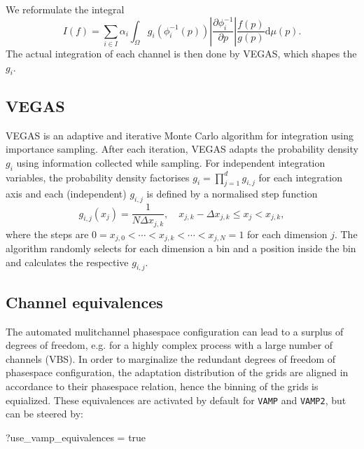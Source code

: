 \documentclass[12pt]{book}
\newenvironment{code}%
  {\begingroup\footnotesize
   \quote
   \Verbatim}%
  {\endVerbatim
   \endquote
   \endgroup\noindent}
\newcommand{\ttt}[1]{\texttt{#1}}
\newcommand{\vamp}{\ttt{VAMP}}
\newcommand{\vamptwo}{\ttt{VAMP2}}
\begin{document}
We reformulate the integral
\begin{equation*}
  I(f) = \sum_{i \in I} \alpha_i \int_\Omega g_i(\phi_i^{-1}(p)) \left| \frac{\partial \phi_i^{-1}}{\partial p} \right| \frac{f(p)}{g(p)} \mathrm{d}\mu(p).
\end{equation*}
The actual integration of each channel is then done by VEGAS, which shapes the $g_i$.

\subsection{VEGAS}
\label{sec:vegas}

VEGAS is an adaptive and iterative Monte Carlo algorithm for integration using
importance sampling. After each iteration, VEGAS adapts the probability density
$g_i$ using information collected while sampling. For independent
integration variables, the probability density factorises $g_i = \prod_{j =
  1}^{d} g_{i,j}$ for each integration axis and each (independent) $g_{i,j}$ is
defined by a normalised step function
\begin{equation*}
  g_{i,j} (x_j) = \frac{1}{N\Delta x_{j,k}}, \quad x_{j,k} - \Delta x_{j,k} \leq x_{j} < x_{j,k},
\end{equation*}
where the steps are $0 = x_{j, 0} < \cdots < x_{j,k} < \cdots < x_{j,N} = 1$ for
each dimension $j$.
The algorithm randomly selects for each dimension a bin and a position inside
the bin and calculates the respective $g_{i,j}$.

\subsection{Channel equivalences}
\label{sec:equivalences}

The automated mulitchannel phasespace configuration can lead to a surplus of
degrees of freedom, e.g. for a highly complex process with a large number of
channels (VBS). In order to marginalize the redundant degrees of freedom of
phasespace configuration, the adaptation distribution of the grids are aligned in accordance to their
phasespace relation, hence the binning of the grids is equialized. These equivalences are activated by
default for \vamp{} and \vamptwo{}, but can be steered by:

\begin{code}
  ?use_vamp_equivalences = true
\end{code}

\end{document}
